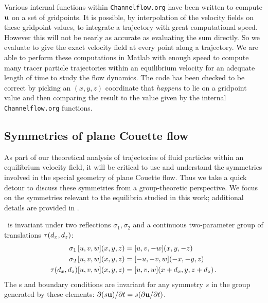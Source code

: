 \documentclass[letter,12pt,openany]{article}
\begin{document}
Various internal functions within {\tt Channelflow.org} have been written to
compute ${\bf u}$ on a set of gridpoints. It is possible, by
interpolation of the velocity fields on these gridpoint values, to
integrate a trajectory with great computational speed. However this
will not be nearly as accurate as evaluating the sum
 directly. So we evaluate
 to give the exact velocity field at every
point along a trajectory. We are able to perform these computations in Matlab with enough speed to compute many tracer particle trajectories within an equilibrium velocity for an adequate length of time to study the flow dynamics.  The code has been
checked to be correct by picking an $(x,y,z)$ coordinate that
\emph{happens} to lie on a gridpoint value and then comparing the
result to the value given by the internal {\tt Channelflow.org} functions. 




\subsection{Symmetries of plane Couette flow}
\label{PCF_symm}

As part of our theoretical analysis of trajectories of fluid particles within an equilibrium velocity field, it will be critical to use and understand the symmetries involved in the special geometry of plane Couette flow. Thus we take a quick detour to discuss these symmetries from a group-theoretic perspective. We focus on the symmetries relevant to the equilibria studied in this work; additional details are provided in \cite{HalcrowThesis}.


\PCf\ is invariant under two reflections $\sigma_1,\sigma_2$ and a
continuous two-parameter group of translations $\tau(d_x, d_z)$:
\begin{align}
\sigma_1 \, [u,v,w](x,y,z) &= [u, v,-w](x,y,-z) \nonumber \\
\sigma_2 \, [u,v,w](x,y,z) &= [-u,-v,w](-x,-y,z)  \label{reflSfit1}\\
\tau(d_x, d_z)[u,v,w](x,y,z) &= [u,v,w](x+d_x,y,z+d_z) \nonumber\,.
\end{align}
The \NSe s and boundary conditions are invariant for any symmetry $s$
in the group generated by these elements:
$\partial (s {\bf u}) / \partial t = s (\partial {\bf u} / \partial t)$.
\end{document}
